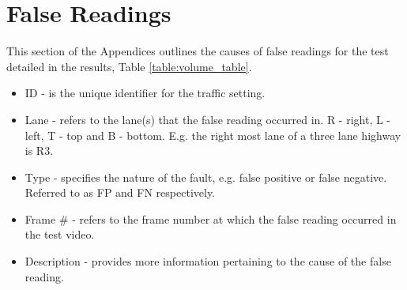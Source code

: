\chapter{False Readings}

This section of the Appendices outlines the causes of false readings for the test detailed in the results, Table \ref{table:volume_table}.

\begin{itemize}
    \item ID - is the unique identifier for the traffic setting.
    \item Lane - refers to the lane(s) that the false reading occurred in. R - right, L - left, T - top and B - bottom. E.g. the right most lane of a three lane highway is R3.
    \item Type - specifies the nature of the fault, e.g. false positive or false negative. Referred to as FP and FN respectively.
    \item Frame \# - refers to the frame number at which the false reading occurred in the test video.
    \item Description - provides more information pertaining to the cause of the false reading.
\end{itemize}


